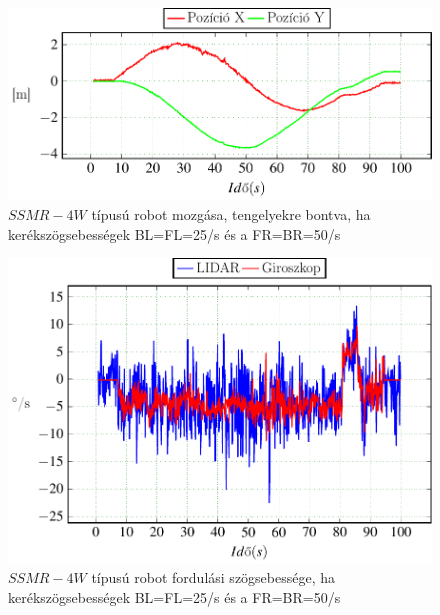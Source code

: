 \begin{figure}[H]
  \includegraphics{tikz/KorP0703a.pdf}
  \caption{$SSMR-4W$ típusú robot mozgása, tengelyekre bontva, ha kerékszögsebességek BL=FL=25\degree/s és a FR=BR=50\degree/s }
  \label{fig:KorP0703a}
\end{figure}







\begin{figure}[H]
  \begin{center}
  	\includegraphics[scale=1]{tikz/KorP0703d.pdf}
  \end{center}
  \caption{$SSMR-4W$ típusú robot fordulási szögsebessége, ha kerékszögsebességek BL=FL=25\degree/s és a FR=BR=50\degree/s}
  \label{fig:KorP0703d}
\end{figure}



